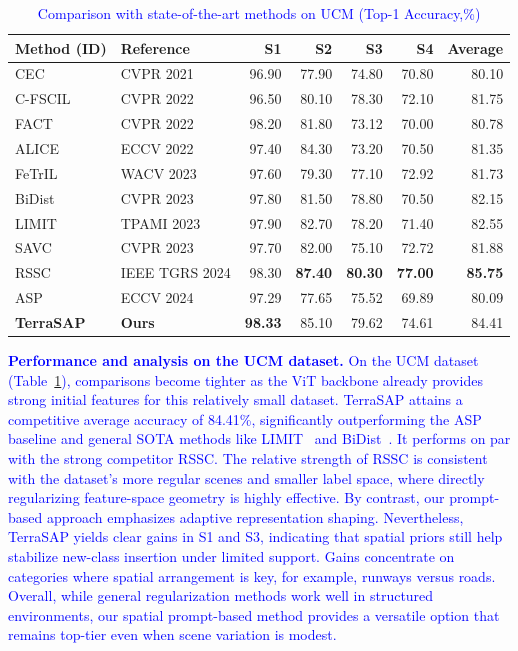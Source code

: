 ﻿\documentclass[letterpaper,journal]{IEEEtran}
\begin{document}
\begin{table}[!t]
\centering
\caption{\textcolor{blue}{Comparison with state-of-the-art methods on UCM (Top-1 Accuracy,\%)}}
\label{tab:ucm_sota}
\begin{tabular}{@{}llrrrrr@{}}
\toprule
Method (ID) & Reference & S1 & S2 & S3 & S4 & \textbf{Average} \\
\midrule
CEC & CVPR 2021 \cite{zhang2021} & 96.90 & 77.90 & 74.80 & 70.80 & 80.10 \\
C-FSCIL & CVPR 2022 \cite{hersche2022cfscil} & 96.50 & 80.10 & 78.30 & 72.10 & 81.75 \\
FACT & CVPR 2022 \cite{zhou2022} & 98.20 & 81.80 & 73.12 & 70.00 & 80.78 \\
ALICE & ECCV 2022 \cite{peng2022alice} & 97.40 & 84.30 & 73.20 & 70.50 & 81.35 \\
FeTrIL & WACV 2023 \cite{petit2023fetril} & 97.60 & 79.30 & 77.10 & 72.92 & 81.73 \\
BiDist & CVPR 2023 \cite{zhao2023bidist} & 97.80 & 81.50 & 78.80 & 70.50 & 82.15 \\
LIMIT & TPAMI 2023 \cite{zhou2023limit} & 97.90 & 82.70 & 78.20 & 71.40 & 82.55 \\
SAVC & CVPR 2023 \cite{song2023savc} & 97.70 & 82.00 & 75.10 & 72.72 & 81.88 \\
RSSC & IEEE TGRS 2024 \cite{nwpu_cankao} & 98.30 & \textbf{87.40} & \textbf{80.30} & \textbf{77.00} & \textbf{85.75} \\
\midrule
ASP & ECCV 2024 \cite{liu2024} & 97.29 & 77.65 & 75.52 & 69.89 & 80.09 \\
\textbf{TerraSAP} & \textbf{Ours} & \textbf{98.33} & 85.10 & 79.62 & 74.61 & 84.41 \\
\bottomrule
\end{tabular}
\end{table}

\textcolor{blue}{\textbf{Performance and analysis on the UCM dataset.}}
\textcolor{blue}{On the UCM dataset (Table~\ref{tab:ucm_sota}), comparisons become tighter as the ViT backbone already provides strong initial features for this relatively small dataset. TerraSAP attains a competitive average accuracy of 84.41\%, significantly outperforming the ASP baseline and general SOTA methods like LIMIT~\cite{zhou2023limit} and BiDist~\cite{zhao2023bidist}. It performs on par with the strong competitor RSSC. The relative strength of RSSC is consistent with the dataset's more regular scenes and smaller label space, where directly regularizing feature-space geometry is highly effective. By contrast, our prompt-based approach emphasizes adaptive representation shaping.}
\textcolor{blue}{Nevertheless, TerraSAP yields clear gains in S1 and S3, indicating that spatial priors still help stabilize new-class insertion under limited support. Gains concentrate on categories where spatial arrangement is key, for example, runways versus roads. Overall, while general regularization methods work well in structured environments, our spatial prompt-based method provides a versatile option that remains top-tier even when scene variation is modest.}
\end{document}
